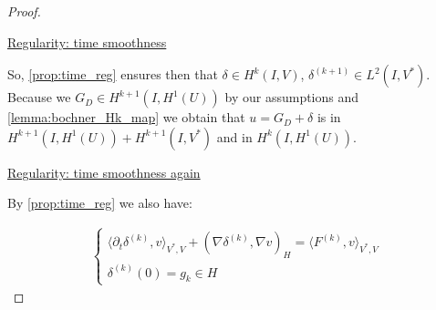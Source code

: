 \documentclass[english,a4paper,9pt,oneside]{scrbook}	%
\theoremstyle{break}
\newenvironment{mproof}[1][\proofname]{%
  \begin{proof}[#1]$ $\par\nobreak\ignorespaces
}{%
  \end{proof}
}
\renewcommand*{\proofname}{Proof}
\theoremstyle{remark}
\begin{document}
\begin{appendices}
\begin{mproof}
%
%
%
%
%
%
%
%
%
%
%
\underline{Regularity: time smoothness}

So, \cref{prop:time_reg} ensures then that $\delta \in H^k(I,V)$, $\delta^{(k+1)} \in L^2(I,V^*)$. Because we $G_D \in H^{k+1}(I,H^1(U))$ by our assumptions and \cref{lemma:bochner_Hk_map} we obtain that $u = G_D + \delta$ is in $H^{k+1}(I,H^1(U)) + H^{k+1}(I,V^*)$ and in $H^k(I,H^{1}(U))$.

\underline{Regularity: time smoothness again}

By \cref{prop:time_reg} we also have:

\begin{align*}
\left\{\begin{matrix}
\langle \partial_t \delta^{(k)},v\rangle_{V^*,V} + (\nabla \delta^{(k)}, \nabla v)_H = \langle F^{(k)}, v\rangle_{V^*,V} \\
\delta^{(k)}(0) = g_k \in H
\end{matrix}\right.
\end{align*}


\end{mproof}
\end{appendices}
\end{document}
